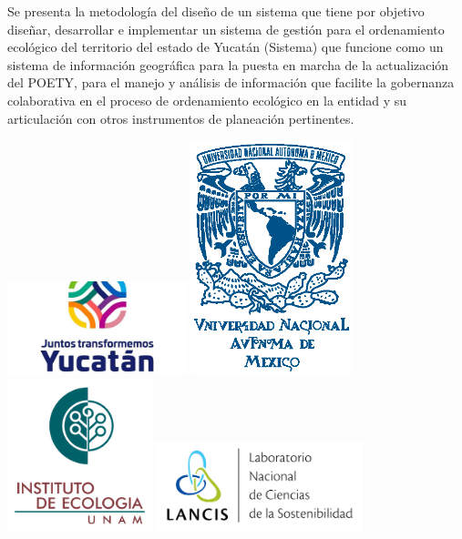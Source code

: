 \begin{titlepage}
\begin{minipage}[t]{0.6\textwidth}
Se presenta la metodología del diseño de un sistema que tiene por objetivo diseñar, desarrollar e implementar un sistema de gestión para el ordenamiento ecológico del territorio del estado de Yucatán (Sistema) que funcione como un sistema de información geográfica para la puesta en marcha de la actualización del POETY, para el manejo y análisis  de información que facilite la gobernanza colaborativa en el proceso de ordenamiento ecológico en la entidad y su articulación con otros instrumentos de planeación pertinentes.
\end{minipage}%
\hfill
\begin{minipage}[t]{0.25\textwidth} 
  \includegraphics[width=52mm]{images/yucatan_logo}\vspace{2cm}
  \includegraphics[width=47mm]{images/UNAM}\vspace{2cm}
  \includegraphics[width=42mm]{images/ie_logo}\vspace{2cm}
  \includegraphics[width=60mm]{images/lancis_logo}
\end{minipage}

\end{titlepage}

\pagebreak

\restoregeometry